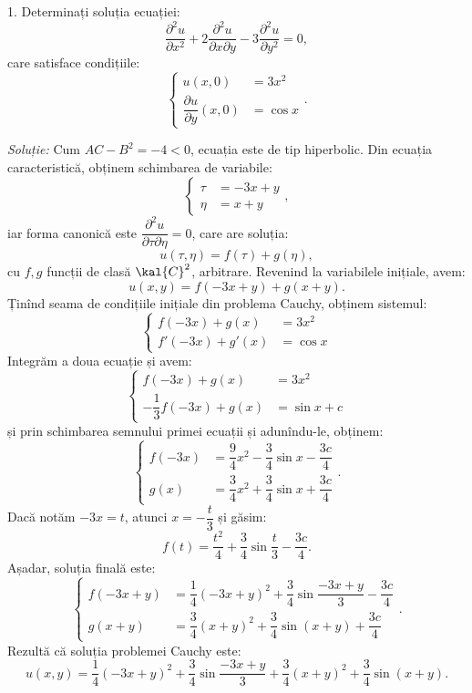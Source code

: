 1. Determinați soluția ecuației:
\[
  \dfrac{\partial^2 u}{\partial x^2} + 2 \dfrac{\partial^2 u}{\partial x \partial y} - %
  3 \dfrac{\partial^2 u}{\partial y^2} = 0,
\]
care satisface condițiile:
\[
  \begin{cases}
    u(x, 0) &= 3x^2 \\
    \dfrac{\partial u}{\partial y}(x, 0) &= \cos x
  \end{cases}.
\]

\emph{Soluție:} Cum $ AC - B^2 = -4 < 0 $, ecuația este de tip hiperbolic.
Din ecuația caracteristică, obținem schimbarea de variabile:
\[
  \begin{cases}
    \tau &= -3x + y \\
    \eta &= x + y
  \end{cases},
\]
iar forma canonică este $ \dfrac{\partial^2 u}{\partial \tau\partial \eta} = 0 $,
care are soluția:
\[
  u(\tau, \eta) = f(\tau) + g(\eta),
\]
cu $ f, g $ funcții de clasă $ \kal{C}^2 $, arbitrare. Revenind la variabilele
inițiale, avem:
\[
  u(x, y) = f(-3x + y) + g(x + y).
\]
Ținînd seama de condițiile inițiale din problema Cauchy, obținem sistemul:
\[
  \begin{cases}
    f(-3x) + g(x) &= 3x^2 \\
    f'(-3x) + g'(x) &= \cos x
  \end{cases}
\]
Integrăm a doua ecuație și avem:
\[
  \begin{cases}
    f(-3x) + g(x) &= 3x^2 \\
    -\dfrac{1}{3}f(-3x) + g(x) &= \sin x + c
  \end{cases}
\]
și prin schimbarea semnului primei ecuații și adunîndu-le, obținem:
\[
  \begin{cases}
    f(-3x) &= \dfrac{9}{4} x^2 - \dfrac{3}{4} \sin x - \dfrac{3c}{4} \\
    g(x) &= \dfrac{3}{4} x^2 + \dfrac{3}{4} \sin x + \dfrac{3c}{4}
  \end{cases}.
\]
Dacă notăm $ -3x = t $, atunci $ x = -\dfrac{t}{3} $ și găsim:
\[
  f(t) = \dfrac{t^2}{4} + \dfrac{3}{4} \sin \dfrac{t}{3} - \dfrac{3c}{4}.
\]
Așadar, soluția finală este:
\[
  \begin{cases}
    f(-3x + y) &= \dfrac{1}{4}(-3x + y)^2 + \dfrac{3}{4} \sin \dfrac{-3x + y}{3} - \dfrac{3c}{4} \\
    g(x + y)   &= \dfrac{3}{4}(x + y)^2 + \dfrac{3}{4} \sin(x + y) + \dfrac{3c}{4}
  \end{cases}.
\]
Rezultă că soluția problemei Cauchy este:
\[
  u(x, y) = \dfrac{1}{4}(-3x + y)^2 + \dfrac{3}{4} \sin \dfrac{-3x + y}{3} + %
  \dfrac{3}{4}(x + y)^2 + \dfrac{3}{4} \sin(x + y).
\]


